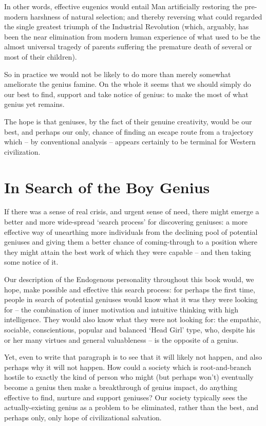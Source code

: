 \documentclass[
]{book}
\begin{document}
In other words, effective eugenics would entail Man artificially restoring the pre-modern harshness of natural selection; and thereby reversing what could regarded the single greatest triumph of the Industrial Revolution (which, arguably, has been the near elimination from modern human experience of what used to be the almost universal tragedy of parents suffering the premature death of several or most of their children).

So in practice we would not be likely to do more than merely somewhat ameliorate the genius famine.
On the whole it seems that we should simply do our best to find, support and take notice of genius: to make the most of what genius yet remains.

The hope is that geniuses, by the fact of their genuine creativity, would be our best, and perhaps our only, chance of finding an escape route from a trajectory which -- by conventional analysis -- appears certainly to be terminal for Western civilization.

\hypertarget{in-search-of-the-boy-genius}{%
\chapter{In Search of the Boy Genius}\label{in-search-of-the-boy-genius}}

If there was a sense of real crisis, and urgent sense of need, there might emerge a better and more wide-spread `search process' for discovering geniuses: a more effective way of unearthing more individuals from the declining pool of potential geniuses and giving them a better chance of coming-through to a position where they might attain the best work of which they were capable -- and then taking some notice of it.

Our description of the Endogenous personality throughout this book would, we hope, make possible and effective this search process: for perhaps the first time, people in search of potential geniuses would know what it was they were looking for -- the combination of inner motivation and intuitive thinking with high intelligence.
They would also know what they were not looking for: the empathic, sociable, conscientious, popular and balanced `Head Girl' type, who, despite his or her many virtues and general valuableness -- is the opposite of a genius.

Yet, even to write that paragraph is to see that it will likely not happen, and also perhaps why it will not happen. How could a society which is root-and-branch hostile to exactly the kind of person who might (but perhaps won't) eventually become a genius then make a breakthrough of genius impact, do anything effective to find, nurture and support geniuses? Our society typically sees the actually-existing genius as a problem to be eliminated, rather than the best, and perhaps only, only hope of civilizational salvation.
\end{document}
